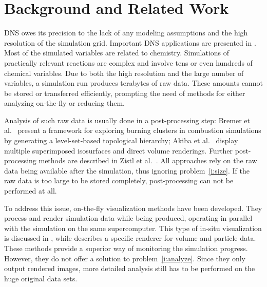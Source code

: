 
\section{Background and Related Work} 
\label{sec:related} 
% 
\ac{DNS} owes its precision to the lack of any modeling assumptions and the high
resolution of the simulation grid. Important \ac{DNS} applications are presented in
\cite{Hilbert2004}. Most of the simulated variables are related to chemistry.
Simulations of practically relevant reactions are complex and involve tens or
even hundreds of chemical variables. Due to both the high resolution and the
large number of variables, a simulation run produces terabytes of raw data.
These amounts cannot be stored or transferred efficiently, prompting the need of
methods for either analyzing on-the-fly or reducing them.

Analysis of such raw data is usually done in a post-processing step: Bremer et
al.~\cite{Bremer2009} present a framework for exploring burning clusters in
combustion simulations by generating a level-set-based topological hierarchy;
Akiba et al.~\cite{Akiba2007} display multiple superimposed isosurfaces and
direct volume renderings. Further post-processing methods are described in Zistl
et al.~\cite{Zistl2009}. All approaches rely on the raw data being available
after the simulation, thus ignoring problem~\ref{i:size}. If the raw data is too
large to be stored completely, post-processing can not be performed at all.


To address this issue, on-the-fly visualization methods have been developed.
They process and render simulation data while being produced, operating in
parallel with the simulation on the same supercomputer. 
%
%
This type of in-situ visualization is discussed in \cite{Ma2009}, while
\cite{Yu2010} describes a specific renderer for volume and particle data. These
methods provide a superior way of monitoring the simulation progress. However,
they do not offer a solution to problem~\ref{i:analyze}. Since they only output
rendered images, more detailed analysis still has to be performed on the huge
original data sets.

